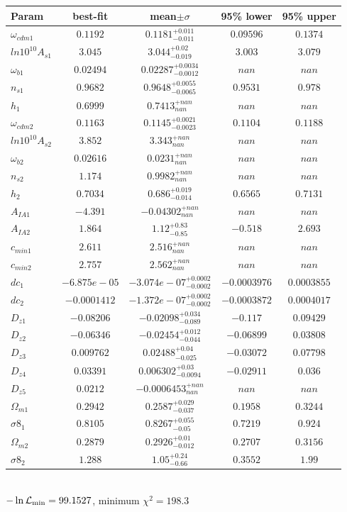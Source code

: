 \begin{tabular}{|l|c|c|c|c|} 
 \hline 
Param & best-fit & mean$\pm\sigma$ & 95\% lower & 95\% upper \\ \hline 
$\omega_{cdm 1 }$ &$0.1192$ & $0.1181_{-0.011}^{+0.011}$ & $0.09596$ & $0.1374$ \\ 
$ln10^{10}A_{s 1 }$ &$3.045$ & $3.044_{-0.019}^{+0.02}$ & $3.003$ & $3.079$ \\ 
$\omega_{b 1 }$ &$0.02494$ & $0.02287_{-0.0012}^{+0.0034}$ & $nan$ & $nan$ \\ 
$n_{s 1 }$ &$0.9682$ & $0.9648_{-0.0065}^{+0.0055}$ & $0.9531$ & $0.978$ \\ 
$h_{1 }$ &$0.6999$ & $0.7413_{nan}^{+nan}$ & $nan$ & $nan$ \\ 
$\omega_{cdm 2 }$ &$0.1163$ & $0.1145_{-0.0023}^{+0.0021}$ & $0.1104$ & $0.1188$ \\ 
$ln10^{10}A_{s 2 }$ &$3.852$ & $3.343_{nan}^{+nan}$ & $nan$ & $nan$ \\ 
$\omega_{b 2 }$ &$0.02616$ & $0.0231_{nan}^{+nan}$ & $nan$ & $nan$ \\ 
$n_{s 2 }$ &$1.174$ & $0.9982_{nan}^{+nan}$ & $nan$ & $nan$ \\ 
$h_{2 }$ &$0.7034$ & $0.686_{-0.014}^{+0.019}$ & $0.6565$ & $0.7131$ \\ 
$A_{IA 1 }$ &$-4.391$ & $-0.04302_{nan}^{+nan}$ & $nan$ & $nan$ \\ 
$A_{IA 2 }$ &$1.864$ & $1.12_{-0.85}^{+0.83}$ & $-0.518$ & $2.693$ \\ 
$c_{min 1 }$ &$2.611$ & $2.516_{nan}^{+nan}$ & $nan$ & $nan$ \\ 
$c_{min 2 }$ &$2.757$ & $2.562_{nan}^{+nan}$ & $nan$ & $nan$ \\ 
$dc_{1 }$ &$-6.875e-05$ & $-3.074e-07_{-0.0002}^{+0.0002}$ & $-0.0003976$ & $0.0003855$ \\ 
$dc_{2 }$ &$-0.0001412$ & $-1.372e-07_{-0.0002}^{+0.0002}$ & $-0.0003872$ & $0.0004017$ \\ 
$D_{z1 }$ &$-0.08206$ & $-0.02098_{-0.089}^{+0.034}$ & $-0.117$ & $0.09429$ \\ 
$D_{z2 }$ &$-0.06346$ & $-0.02454_{-0.044}^{+0.012}$ & $-0.06899$ & $0.03808$ \\ 
$D_{z3 }$ &$0.009762$ & $0.02488_{-0.025}^{+0.04}$ & $-0.03072$ & $0.07798$ \\ 
$D_{z4 }$ &$0.03391$ & $0.006302_{-0.0094}^{+0.03}$ & $-0.02911$ & $0.036$ \\ 
$D_{z5 }$ &$0.0212$ & $-0.0006453_{nan}^{+nan}$ & $nan$ & $nan$ \\ 
$\Omega_{m 1 }$ &$0.2942$ & $0.2587_{-0.037}^{+0.029}$ & $0.1958$ & $0.3244$ \\ 
$\sigma8_{1 }$ &$0.8105$ & $0.8267_{-0.05}^{+0.055}$ & $0.7219$ & $0.924$ \\ 
$\Omega_{m 2 }$ &$0.2879$ & $0.2926_{-0.012}^{+0.01}$ & $0.2707$ & $0.3156$ \\ 
$\sigma8_{2 }$ &$1.288$ & $1.05_{-0.66}^{+0.24}$ & $0.3552$ & $1.99$ \\ 
\hline 
 \end{tabular} \\ 
$-\ln{\cal L}_\mathrm{min} =99.1527$, minimum $\chi^2=198.3$ \\ 
